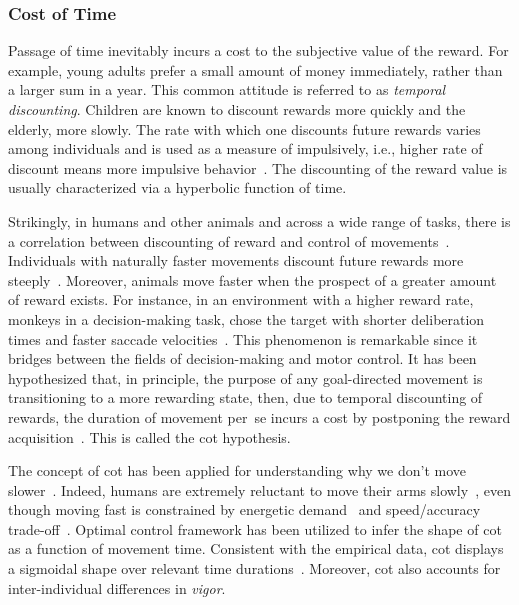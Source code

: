 \subsubsection{Cost of Time}
Passage of time inevitably incurs a cost to the subjective value of the reward.
For example, young adults prefer a small amount of money immediately, rather than a larger sum in a year.
This common attitude is referred to as \emph{temporal discounting}.
Children are known to discount rewards more quickly and the elderly, more slowly.
The rate with which one discounts future rewards varies among individuals and is used as a measure of impulsively, i.e., higher rate of discount means more impulsive behavior~\cite{Choi2014JNeurosci}.
The discounting of the reward value is usually characterized via a hyperbolic function of time.
\par
Strikingly, in humans and other animals and across a wide range of tasks, there is a correlation between discounting of reward and control of movements~\cite{Shadmehr2010Jneurosci, Choi2014JNeurosci, Berret2018SciReports, Shadmehr2016CurrBiol, Berret2016JNeurosci}.
Individuals with naturally faster movements discount future rewards more steeply~\cite{Choi2014JNeurosci}.
Moreover, animals move faster when the prospect of a greater amount of reward exists.
For instance, in an environment with a higher reward rate, monkeys in a decision-making task, chose the target with shorter deliberation times and faster saccade velocities~\cite{Thura2014JNeurosci}.
This phenomenon is remarkable since it bridges between the fields of decision-making and motor control.
It has been hypothesized that, in principle, the purpose of any goal-directed movement is transitioning to a more rewarding state, then, due to temporal discounting of rewards, the duration of movement per~se incurs a cost by postponing the reward acquisition~\cite{Shadmehr2010Jneurosci}.
This is called the \gls{cot} hypothesis.
\par
The concept of \gls{cot} has been applied for understanding why we don't move slower~\cite{Berret2016JNeurosci}.
Indeed, humans are extremely reluctant to move their arms slowly~\cite{Berret2018SciReports}, even though moving fast is constrained by energetic demand~\cite{Long2013RoSocInterface} and speed/accuracy trade-off~\cite{Harris2006BioCyber}.
Optimal control framework has been utilized to infer the shape of \gls{cot} as a function of movement time.
Consistent with the empirical data, \gls{cot} displays a sigmoidal shape over relevant time durations~\cite{Berret2016JNeurosci}.
Moreover, \gls{cot} also accounts for inter-individual differences in \emph{vigor}\footnotemark.
